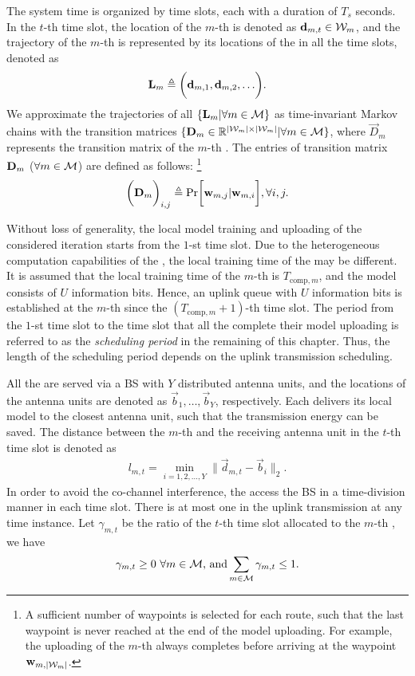 The system time is organized by time slots, each with a duration of $T_s$ seconds.
In the $t$-th time slot, the location of the $m$-th {\IAV} is denoted as $\mathbf{d}_{m,t} \in \mathcal{W}_{m}$, and the trajectory of the $m$-th {\IAV} is represented by its locations of the {\IAV} in all the time slots, denoted as
\begin{align*}
    \vec{L}_{m} \define \Paren{ \vec{d}_{m,1}, \vec{d}_{m,2}, \dots }.
\end{align*}
We approximate the trajectories of all {\IAVs} $\{ \mathbf{L}_{m} | \forall m\in\mathcal{M} \}$ as time-invariant Markov chains with the transition matrices
$\{ \mathbf{D}_{m} \in \mathbb{R}^{|\mathcal{W}_{m}| \times |\mathcal{W}_{m}|} | \forall m\in\mathcal{M} \}$, where $\vec{D}_{m}$ represents the transition matrix of the $m$-th {\IAV}.
The entries of transition matrix $\mathbf{D}_{m}$ ($\forall m\in\mathcal{M}$) are defined as follows:
\footnote{
    A sufficient number of waypoints is selected for each route, such that the last waypoint is never reached at the end of the model uploading.
    For example, the uploading of the $m$-th {\IAV} always completes before arriving at the waypoint $\mathbf{w}_{m,|\mathcal{W}_m|}$.
}
\begin{align}
     \Paren{\TransD_{m}}_{i,j} \define \Pr\Bracket{ \vec{w}_{m,j} | \vec{w}_{m,i} }, \forall i,j.
    \label{eqn:trans_mat}
\end{align}

Without loss of generality, the local model training and uploading of the considered iteration starts from the $1$-st time slot.
Due to the heterogeneous computation capabilities of the {\IAVs}, the local training time of the {\IAVs} may be different.
It is assumed that the local training time of the $m$-th {\IAV} is $T_{\text{comp},m}$, and the model consists of $U$ information bits.
Hence, an uplink queue with $U$ information bits is established at the $m$-th {\IAV} since the $(T_{\text{comp},m}+1)$-th time slot.
The period from the $1$-st time slot to the time slot that all the {\IAVs} complete their model uploading is referred to as the \emph{scheduling period} in the remaining of this chapter.
Thus, the length of the scheduling period depends on the uplink transmission scheduling.

All the {\IAVs} are served via a BS with $Y$ distributed antenna units,
and the locations of the antenna units are denoted as $\vec{b}_1, \dots, \vec{b}_Y$, respectively.
Each {\IAV} delivers its local model to the closest antenna unit, such that the transmission energy can be saved.
The distance between the $m$-th {\IAV} and the receiving antenna unit in the $t$-th time slot is denoted as
\begin{align*}
    l_{m,t} = \min_{i=1,2,\dots,Y} \|\vec{d}_{m,t} - \vec{b}_i\|_2.
\end{align*}
In order to avoid the co-channel interference, the {\IAVs} access the BS in a time-division manner in each time slot. There is at most one {\IAV} in the uplink transmission at any time instance. Let $\gamma_{m,t}$ be the ratio of the $t$-th time slot allocated to the $m$-th {\IAV}, we have
\begin{align*}
    \gamma_{m,t} \geq 0~\forall m\in\mathcal{M} \text{,~and} \sum_{m\in\mathcal{M}} \gamma_{m,t} \leq 1.
\end{align*}

